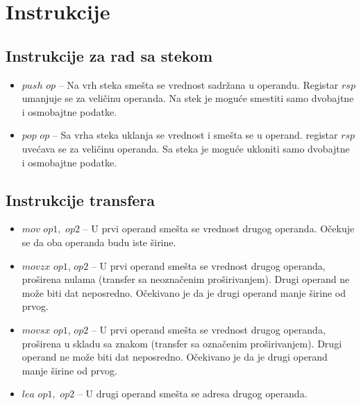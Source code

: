 \documentclass[a4paper, 10pt]{article}
\begin{document}
\section{Instrukcije}
	\subsection{Instrukcije za rad sa stekom}
		\begin{itemize}
			\item $push$ $op$ -- Na vrh steka smešta se vrednost sadržana u operandu. Registar $rsp$ umanjuje se za veličinu operanda. Na stek je moguće smestiti samo dvobajtne i osmobajtne podatke.
		 \item $pop$ $op$ -- Sa vrha steka uklanja se vrednost i smešta se u operand. registar $rsp$ uvećava se za veličinu operanda. Sa steka je moguće ukloniti samo dvobajtne i osmobajtne podatke. 
		 \end{itemize}
	\subsection{Instrukcije transfera}
		\begin{itemize}
			\item $mov$ $op1,$ $op2$ -- U prvi operand smešta se vrednost drugog operanda. Očekuje se da oba operanda budu iste širine.
			\item $movzx$ $op1$, $op2$ -- U prvi operand smešta se vrednost drugog operanda, proširena nulama (transfer sa neoznačenim proširivanjem). Drugi operand ne može biti dat neposredno. Očekivano je da je drugi operand manje širine od prvog.
			\item $movsx$ $op1$, $op2$ -- U prvi operand smešta se vrednost drugog operanda, proširena u skladu sa znakom (transfer sa označenim proširivanjem).  Drugi operand ne može biti dat neposredno. Očekivano je da je drugi operand manje širine od prvog.
			\item $lea$ $op1,$ $op2$ -- U drugi operand smešta se adresa drugog operanda.
		\end{itemize}
\end{document}
